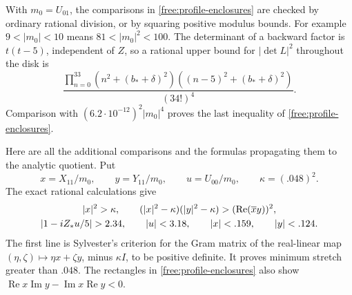 \documentclass[11pt]{article}
\numberwithin{equation}{section}
\theoremstyle{definition}
\theoremstyle{remark}
\begin{document}
With $m_0=U_{01}$, the comparisons in
\eqref{free:profile-enclosures} are checked by ordinary rational
division, or by squaring positive modulus bounds.  For example
$9<|m_0|<10$ means $81<|m_0|^2<100$.  The determinant of a backward
factor is $t(t-5)$, independent of $Z$, so a rational upper bound for
$|\det L|^2$ throughout the disk is
\begin{equation}\label{cert:profile-determinant}
 \frac{\displaystyle\prod_{n=0}^{33}
 (n^2+(b_*+\delta)^2)((n-5)^2+(b_*+\delta)^2)}{(34!)^4}.
\end{equation}
Comparison with $(6.2\cdot10^{-12})^2|m_0|^4$ proves the last
inequality of \eqref{free:profile-enclosures}.

Here are all the additional comparisons and the formulas propagating
them to the analytic quotient.  Put
\[
 x=X_{11}/m_0,\qquad y=Y_{11}/m_0,\qquad u=U_{00}/m_0,
 \qquad \kappa=(.048)^2.
\]
The exact rational calculations give
\begin{gather}
 |x|^2>\kappa,\qquad
 (|x|^2-\kappa)(|y|^2-\kappa)
       >(\operatorname{Re}(\overline xy))^2,\notag\\
 |1-iZ_*u/5|>2.34,\qquad |u|<3.18,\qquad
 |x|<.159,\qquad |y|<.124.\label{cert:profile-extra}
\end{gather}
The first line is Sylvester's criterion for the Gram matrix of the
real-linear map $(\eta,\zeta)\mapsto\eta x+\zeta y$, minus
$\kappa I$, to be positive definite.  It proves minimum stretch
greater than $.048$.  The rectangles in
\eqref{free:profile-enclosures} also show
$\operatorname{Re}x\operatorname{Im}y-\operatorname{Im}x\operatorname{Re}y<0$.
\end{document}
